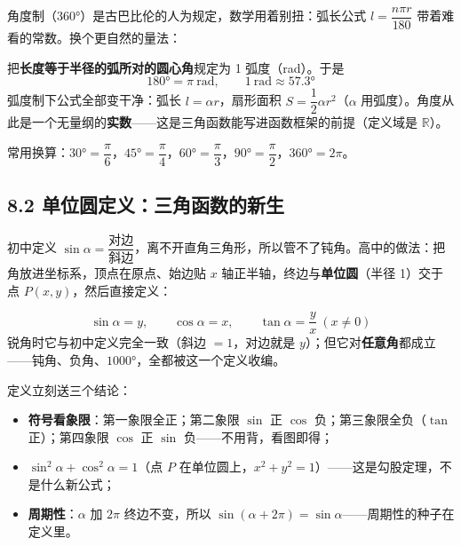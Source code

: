 \documentclass[UTF8,a4paper,11pt]{ctexart}
\begin{document}
角度制（$360°$）是古巴比伦的人为规定，数学用着别扭：弧长公式 $l = \dfrac{n\pi r}{180}$ 带着难看的常数。换个更自然的量法：

\begin{keyconcept}[弧度制]
把\textbf{长度等于半径的弧所对的圆心角}规定为 1 弧度（rad）。于是
\[
180° = \pi\ \text{rad}, \qquad 1\ \text{rad} \approx 57.3°
\]
弧度制下公式全部变干净：弧长 $l = \alpha r$，扇形面积 $S = \dfrac{1}{2}\alpha r^2$（$\alpha$ 用弧度）。角度从此是一个无量纲的\textbf{实数}——这是三角函数能写进函数框架的前提（定义域是 $\mathbb{R}$）。
\end{keyconcept}

常用换算：$30° = \dfrac{\pi}{6}$，$45° = \dfrac{\pi}{4}$，$60° = \dfrac{\pi}{3}$，$90° = \dfrac{\pi}{2}$，$360° = 2\pi$。

\subsection*{8.2 单位圆定义：三角函数的新生}

初中定义 $\sin\alpha = \dfrac{\text{对边}}{\text{斜边}}$，离不开直角三角形，所以管不了钝角。高中的做法：把角放进坐标系，顶点在原点、始边贴 $x$ 轴正半轴，终边与\textbf{单位圆}（半径 1）交于点 $P(x, y)$，然后直接定义：

\begin{keyconcept}[任意角的三角函数]
\[
\sin\alpha = y, \qquad \cos\alpha = x, \qquad \tan\alpha = \frac{y}{x}\ (x \neq 0)
\]
锐角时它与初中定义完全一致（斜边 $=1$，对边就是 $y$）；但它对\textbf{任意角}都成立——钝角、负角、$1000°$，全都被这一个定义收编。
\end{keyconcept}

\begin{center}
\end{center}

定义立刻送三个结论：
\begin{itemize}
  \item \textbf{符号看象限}：第一象限全正；第二象限 $\sin$ 正 $\cos$ 负；第三象限全负（$\tan$ 正）；第四象限 $\cos$ 正 $\sin$ 负——不用背，看图即得；
  \item $\sin^2\alpha + \cos^2\alpha = 1$（点 $P$ 在单位圆上，$x^2 + y^2 = 1$）——这是勾股定理，不是什么新公式；
  \item \textbf{周期性}：$\alpha$ 加 $2\pi$ 终边不变，所以 $\sin(\alpha + 2\pi) = \sin\alpha$——周期性的种子在定义里。
\end{itemize}
\end{document}
